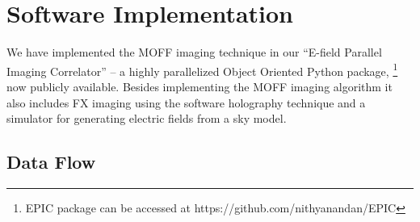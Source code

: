 \documentclass[a4paper,fleqn,usenatbib]{../mnras}
\begin{document}
%

\section{Software Implementation}\label{sec:software}

We have implemented the MOFF imaging technique in our ``E-field Parallel Imaging
Correlator'' -- a highly parallelized Object Oriented Python package,
\footnote{EPIC package can be accessed at https://github.com/nithyanandan/EPIC}
now publicly available. Besides implementing the MOFF imaging algorithm it also
includes FX imaging using the software holography technique and a simulator for
generating electric fields from a sky model. 

\subsection{Data Flow}
\end{document}
